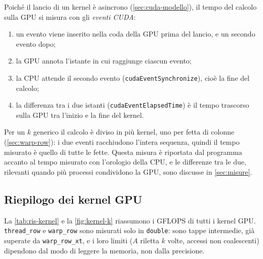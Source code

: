 \documentclass[11pt,a4paper]{article}
\begin{document}
Poiché il lancio di un kernel è asincrono
(\cref{sec:cuda-modello}), il tempo del calcolo sulla GPU si misura con gli
\emph{eventi CUDA}:
\begin{enumerate}
  \item un evento viene inserito nella coda della GPU prima del lancio, e un
        secondo evento dopo;
  \item la GPU annota l'istante in cui raggiunge ciascun evento;
  \item la CPU attende il secondo evento (\texttt{cudaEventSynchronize}), cioè
        la fine del calcolo;
  \item la differenza tra i due istanti (\texttt{cudaEventElapsedTime}) è il
        tempo trascorso sulla GPU tra l'inizio e la fine del kernel.
\end{enumerate}
Per un $k$ generico il calcolo è diviso in più kernel, uno per fetta di colonne
(\cref{sec:warp-row}): i due eventi racchiudono l'intera sequenza, quindi il
tempo misurato è quello di tutte le fette. Questa misura è riportata dal
programma accanto al tempo misurato con l'orologio della CPU, e le differenze tra
le due, rilevanti quando più processi condividono la GPU, sono discusse in
\cref{sec:misure}.

\subsection{Riepilogo dei kernel GPU}\label{sec:gpu-riepilogo}

La \cref{tab:ris-kernel} e la \cref{fig:kernel-k} riassumono i GFLOPS
di tutti i kernel GPU. \texttt{thread\_row} e \texttt{warp\_row} sono misurati
solo in \texttt{double}: sono tappe intermedie, già superate da
\texttt{warp\_row\_xt}, e i loro limiti ($A$ riletta $k$ volte, accessi non
coalescenti) dipendono dal modo di leggere la memoria, non dalla precisione.
\end{document}
